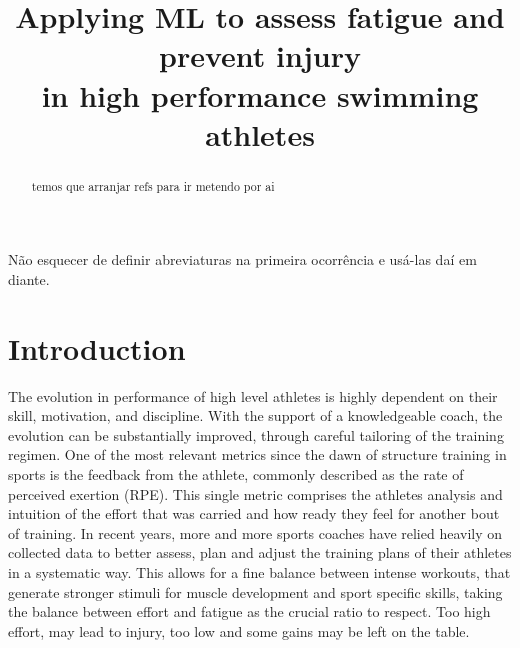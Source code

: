 \documentclass[conference]{IEEEtran}
\begin{document}
\title{Applying ML to assess fatigue and prevent injury\\in high performance swimming athletes}

\author{
\and
{}
}


\maketitle
\thispagestyle{plain}

\begin{abstract}
temos que arranjar refs para ir metendo por ai
\end{abstract}
Não esquecer de definir abreviaturas na primeira ocorrência e usá-las daí em diante.

\IEEEpeerreviewmaketitle


\section{Introduction}
The evolution in performance of high level athletes is highly dependent on their skill, motivation, and discipline. With the support of a knowledgeable coach, the evolution can be substantially improved, through careful tailoring of the training regimen. One of the most relevant metrics since the dawn of structure training in sports is the feedback from the athlete, commonly described as the rate of perceived exertion (RPE). This single metric comprises the athletes analysis and intuition of the effort that was carried and how ready they feel for another bout of training. In recent years, more and more sports coaches have relied heavily on collected data to better assess, plan and adjust the training plans of their athletes in a systematic way. This allows for a fine balance between intense workouts, that generate stronger stimuli for muscle development and sport specific skills, taking the balance between effort and fatigue as the crucial ratio to respect. Too high effort, may lead to injury, too low and some gains may be left on the table. 
\end{document}
